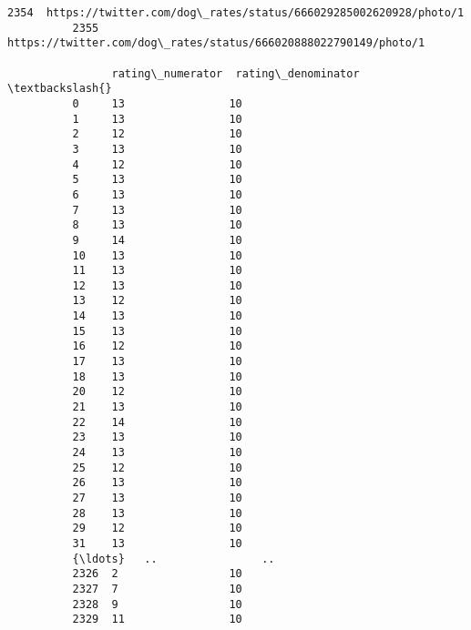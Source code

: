 \documentclass[11pt]{article}
\begin{document}
\begin{Verbatim}[commandchars=\\\{\}]
          2354  https://twitter.com/dog\_rates/status/666029285002620928/photo/1                                                                                                                                                                                                   
          2355  https://twitter.com/dog\_rates/status/666020888022790149/photo/1                                                                                                                                                                                                   
          
                rating\_numerator  rating\_denominator  \textbackslash{}
          0     13                10                   
          1     13                10                   
          2     12                10                   
          3     13                10                   
          4     12                10                   
          5     13                10                   
          6     13                10                   
          7     13                10                   
          8     13                10                   
          9     14                10                   
          10    13                10                   
          11    13                10                   
          12    13                10                   
          13    12                10                   
          14    13                10                   
          15    13                10                   
          16    12                10                   
          17    13                10                   
          18    13                10                   
          20    12                10                   
          21    13                10                   
          22    14                10                   
          23    13                10                   
          24    13                10                   
          25    12                10                   
          26    13                10                   
          27    13                10                   
          28    13                10                   
          29    12                10                   
          31    13                10                   
          {\ldots}   ..                ..                   
          2326  2                 10                   
          2327  7                 10                   
          2328  9                 10                   
          2329  11                10                   

\end{Verbatim}
\end{document}
